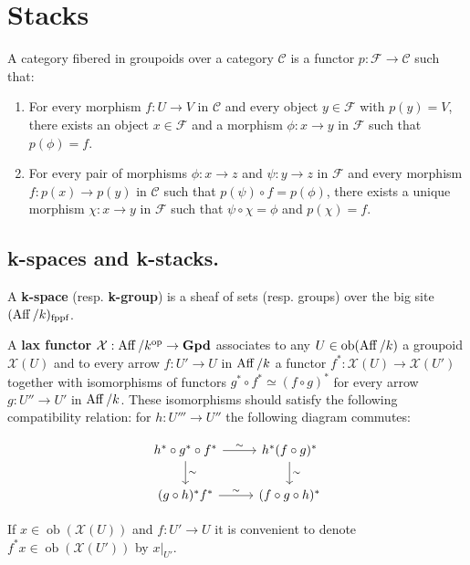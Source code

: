 \documentclass[12pt]{article}
\begin{document}
\section{Stacks}
\begin{definition}
    A category fibered in groupoids over a category $\mathcal{C}$ is a functor $p: \mathcal{F} \to \mathcal{C}$ such that:
    \begin{enumerate}
        \item For every morphism $f: U \to V$ in $\mathcal{C}$ and every object $y \in \mathcal{F}$ with $p(y) = V$, there exists an object $x \in \mathcal{F}$ and a morphism $\phi: x \to y$ in $\mathcal{F}$ such that $p(\phi) = f$.

        \item For every pair of morphisms $\phi: x \to z$ and $\psi: y \to z$ in $\mathcal{F}$ and every morphism $f: p(x) \to p(y)$ in $\mathcal{C}$ such that $p(\psi) \circ f = p(\phi)$, there exists a unique morphism $\chi: x \to y$ in $\mathcal{F}$ such that $\psi \circ \chi = \phi$ and $p(\chi) = f$.
    \end{enumerate}
\end{definition}

\subsection{k-spaces and k-stacks.}
\begin{definition}
    A \textbf{k-space} (resp. \textbf{k-group}) is a sheaf of sets (resp. groups) over the big site $(\operatorname{Aff}/k)_{\text{fppf}}$.

\end{definition}
\begin{definition}
    A \textbf{lax functor} $\mathcal{X}:\operatorname{Aff}/k^{\text{op}}\to \mathbf{Gpd}$ associates to any $U \in \operatorname{ob}(\operatorname{Aff}/k)$ a groupoid $\mathcal{X}(U)$ and to every arrow $f: U' \to U$ in $\operatorname{Aff}/k$ a functor $f^*: \mathcal{X}(U) \to \mathcal{X}(U')$ together with isomorphisms of functors
    $g^* \circ f^* \simeq (f \circ g)^*$ for every arrow $g: U'' \to U'$ in $\operatorname{Aff}/k$. These isomorphisms should satisfy the following compatibility relation:
    for $h: U''' \to U''$ the following diagram commutes:

    \[
        \begin{tikzcd}
            h^* \circ g^* \circ f^* \arrow[r, "\sim"] \arrow[d, "\sim"] & h^*(f \circ g)^* \arrow[d, "\sim"] \\
            (g \circ h)^* f^* \arrow[r, "\sim"] & (f \circ g \circ h)^*
        \end{tikzcd}
    \]
\end{definition}
If $x \in \operatorname{ob}(\mathcal{X}(U))$ and $f: U' \to U$ it is convenient to denote $f^*x \in \operatorname{ob}(\mathcal{X}(U'))$ by $x|_{U'}$.
\end{document}
